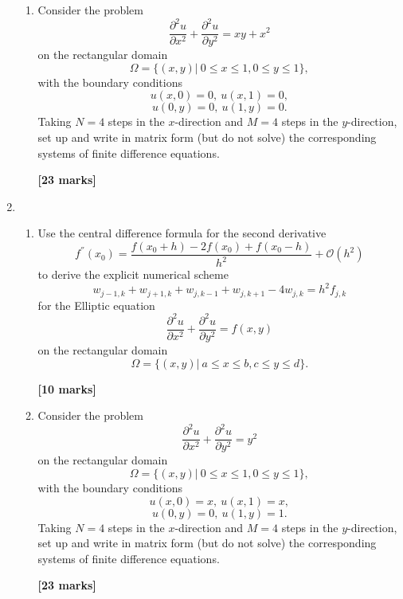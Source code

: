 \begin{enumerate}
\begin{enumerate}
\item Consider the problem
\[\frac{\partial^2 u}{\partial x^2}+\frac{\partial^2 u}{\partial y^2}=xy+x^2 \]
on the rectangular domain
\[\Omega=\{(x,y)| \ 0\leq x \leq 1, 0 \leq y \leq 1\}, \]
with the boundary conditions
\[ u(x,0)=0, \ u(x,1)=0, \] \[ u(0,y)=0, \ u(1,y)=0.   \]
Taking $N=4$ steps in the $x$-direction and $M=4$ steps in the $y$-direction, set up and write in matrix form (but do not solve) the corresponding systems of finite difference equations.
\begin{flushright}
\textbf{[23 marks]}
\end{flushright}
		
\end{enumerate}
\newpage
\item
	\begin{enumerate}
	
\item 
Use the central difference formula for the second derivative 
\[ f^{''}(x_0)=\frac{f(x_0+h)-2f(x_0)+f(x_0-h)}{h^2}+\mathcal{O}(h^2)\]
to derive the explicit numerical scheme
\[w_{j-1,k}+w_{j+1,k}+w_{j,k-1}+w_{j,k+1}-4w_{j,k}=h^2f_{j,k}\]
for the Elliptic equation 
\[\frac{\partial^2 u}{\partial x^2}+\frac{\partial^2 u}{\partial y^2}=f(x,y) \]
on the rectangular domain
\[\Omega=\{(x,y)| \ a\leq x \leq b, c \leq y \leq d\}. \]
\begin{flushright}
\textbf{[10 marks]}
\end{flushright}
	
\item Consider the problem
\[\frac{\partial^2 u}{\partial x^2}+\frac{\partial^2 u}{\partial y^2}=y^2 \]
on the rectangular domain
\[\Omega=\{(x,y)| \ 0\leq x \leq 1, 0 \leq y \leq 1\}, \]
with the boundary conditions
\[ u(x,0)=x, \ u(x,1)=x, \] \[ u(0,y)=0, \ u(1,y)=1.   \]
Taking $N=4$ steps in the $x$-direction and $M=4$ steps in the $y$-direction, set up and write in matrix form (but do not solve) the corresponding systems of finite difference equations.
\begin{flushright}
\textbf{[23 marks]}
\end{flushright}

\end{enumerate}

\end{enumerate}

